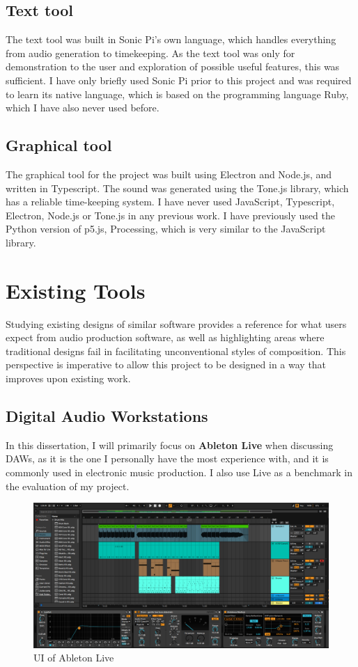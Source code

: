 \documentclass[12pt,a4paper,oneside,openright]{report}
\begin{document}
\subsection{Text tool}
The text tool was built in Sonic Pi's own language, which handles everything from audio generation to timekeeping. As the text tool was only for demonstration to the user and exploration of possible useful features, this was sufficient. I have only briefly used Sonic Pi prior to this project and was required to learn its native language, which is based on the programming language Ruby, which I have also never used before.

\subsection{Graphical tool}
The graphical tool for the project was built using Electron and Node.js, and written in Typescript. The sound was generated using the Tone.js library, which has a reliable time-keeping system. I have never used JavaScript, Typescript, Electron, Node.js or Tone.js in any previous work. I have previously used the Python version of p5.js, Processing, which is very similar to the JavaScript library.

\section{Existing Tools}
Studying existing designs of similar software provides a reference for what users expect from audio production software, as well as highlighting areas where traditional designs fail in facilitating unconventional styles of composition. This perspective is imperative to allow this project to be designed in a way that improves upon existing work.

\subsection{Digital Audio Workstations}
In this dissertation, I will primarily focus on \textbf{Ableton Live} when discussing DAWs, as it is the one I personally have the most experience with, and it is commonly used in electronic music production. I also use Live as a benchmark in the evaluation of my project.

\begin{figure}[h]
    \centering
    \includegraphics[scale=0.3]{images/ableton example.png}
    \caption{UI of Ableton Live}
    \label{fig:ableton}
\end{figure}
\end{document}
